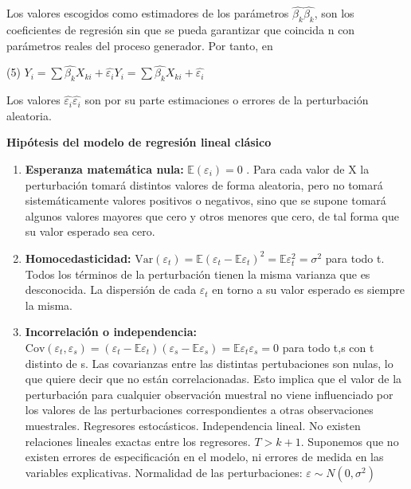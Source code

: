 \documentclass{article}
\begin{document}
Los valores escogidos como estimadores de los par\'ametros ${\displaystyle {\hat {\beta _{k}}}} {\displaystyle {\hat {\beta _{k}}}}$, son los coeficientes de regresi\'on sin que se pueda garantizar que coincida n con par\'ametros reales del proceso generador. Por tanto, en

(5) ${\displaystyle Y_{i}=\sum {\hat {\beta _{k}}}X_{ki}+{\hat {\varepsilon _{i}}}} {\displaystyle Y_{i}=\sum {\hat {\beta _{k}}}X_{ki}+{\hat {\varepsilon _{i}}}}$

Los valores ${\displaystyle {\hat {\varepsilon _{i}}}} {\displaystyle {\hat {\varepsilon _{i}}}}$ son por su parte estimaciones o errores de la perturbaci\'on aleatoria.


\textbf{Hip\'otesis del modelo de regresi\'on lineal cl\'asico}

\begin{enumerate}
\item \textbf{Esperanza matem\'atica nula:} ${\displaystyle \mathbb{E} (\varepsilon _{i})=0}$ . Para cada valor de X la perturbaci\'on tomar\'a distintos valores de forma aleatoria, pero no tomar\'a 
sistem\'aticamente valores positivos o negativos, sino que se supone tomar\'a algunos valores mayores que cero y otros menores que cero, de tal forma que su valor esperado sea cero.


\item \textbf{Homocedasticidad:} ${\displaystyle {\text{Var}}(\varepsilon _{t})=\mathbb {E} (\varepsilon _{t}-\mathbb {E} \varepsilon _{t})^{2}=\mathbb {E} \varepsilon _{t}^{2}=\sigma ^{2}}$ para todo t. Todos los t\'erminos de la perturbaci\'on tienen la misma varianza que es desconocida. La dispersi\'on de cada ${\displaystyle \varepsilon _{t}} $ en torno a su valor esperado es siempre la misma.

\item \textbf{Incorrelaci\'on o independencia:} ${\displaystyle {\text{Cov}}(\varepsilon _{t},\varepsilon _{s})=(\varepsilon _{t}-\mathbb {E} \varepsilon _{t})(\varepsilon _{s}-\mathbb {E} \varepsilon _{s})=\mathbb {E} \varepsilon _{t}\varepsilon _{s}=0}$ para todo t,s con t distinto de s. Las covarianzas entre las distintas pertubaciones son nulas, lo que quiere decir que no est\'an correlacionadas. Esto implica que el valor de la perturbaci\'on para cualquier observaci\'on muestral no viene influenciado por los valores de las perturbaciones correspondientes a otras observaciones muestrales.
Regresores estoc\'asticos.
Independencia lineal. No existen relaciones lineales exactas entre los regresores.
${\displaystyle T>k+1}$. Suponemos que no existen errores de especificaci\'on en el modelo, ni errores de medida en las variables explicativas.
Normalidad de las perturbaciones: ${\displaystyle \varepsilon \sim N(0,\sigma ^{2})}$

\end{enumerate}
\end{document}
